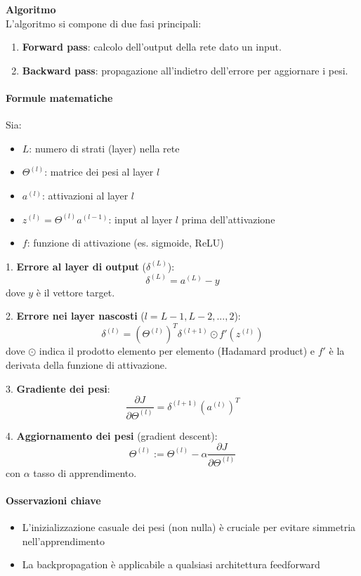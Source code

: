 \documentclass[10pt,oneside,a4paper]{article}
\begin{document}
	\textbf{Algoritmo}\\
	L'algoritmo si compone di due fasi principali:
	\begin{enumerate}
		\item \textbf{Forward pass}: calcolo dell'output della rete dato un input.
		\item \textbf{Backward pass}: propagazione all'indietro dell'errore per aggiornare i pesi.
	\end{enumerate}
	
	\paragraph{Formule matematiche}
	Sia:
	\begin{itemize}
		\item $L$: numero di strati (layer) nella rete
		\item $\Theta^{(l)}$: matrice dei pesi al layer $l$
		\item $a^{(l)}$: attivazioni al layer $l$
		\item $z^{(l)} = \Theta^{(l)}a^{(l-1)}$: input al layer $l$ prima dell'attivazione
		\item $f$: funzione di attivazione (es. sigmoide, ReLU)
	\end{itemize}
	
	1. \textbf{Errore al layer di output} ($\delta^{(L)}$):
	\[
	\delta^{(L)} = a^{(L)} - y
	\]
	dove $y$ è il vettore target.
	
	2. \textbf{Errore nei layer nascosti} ($l = L-1, L-2, ..., 2$):
	\[
	\delta^{(l)} = (\Theta^{(l)})^T \delta^{(l+1)} \odot f'(z^{(l)})
	\]
	dove $\odot$ indica il prodotto elemento per elemento (Hadamard product) e $f'$ è la derivata della funzione di attivazione.
	
	3. \textbf{Gradiente dei pesi}:
	\[
	\frac{\partial J}{\partial \Theta^{(l)}} = \delta^{(l+1)} (a^{(l)})^T
	\]
	
	4. \textbf{Aggiornamento dei pesi} (gradient descent):
	\[
	\Theta^{(l)} := \Theta^{(l)} - \alpha \frac{\partial J}{\partial \Theta^{(l)}}
	\]
	con $\alpha$ tasso di apprendimento.
	
	\paragraph{Osservazioni chiave}
	\begin{itemize}
		\item L'inizializzazione casuale dei pesi (non nulla) è cruciale per evitare simmetria nell'apprendimento
		\item La backpropagation è applicabile a qualsiasi architettura feedforward
	\end{itemize}
\end{document}
